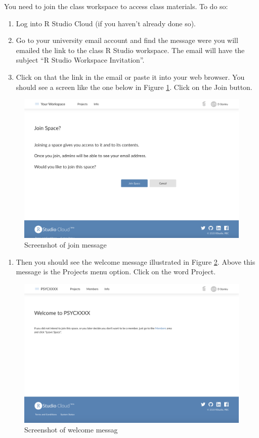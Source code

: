 \documentclass[
]{krantz}
\providecommand{\tightlist}{%
  \setlength{\itemsep}{0pt}\setlength{\parskip}{0pt}}
\begin{document}
You need to join the class workspace to access class materials. To do so:

\begin{enumerate}
\def\labelenumi{\arabic{enumi}.}
\item
  Log into R Studio Cloud (if you haven't already done so).
\item
  Go to your university email account and find the message were you will emailed the link to the class R Studio workspace. The email will have the subject ``R Studio Workspace Invitation''.
\item
  Click on that the link in the email or paste it into your web browser. You should see a screen like the one below in Figure \ref{fig:join}. Click on the Join button.
\end{enumerate}

\begin{figure}
\includegraphics[width=0.85\linewidth]{first_time/images/screenshot_join} \caption{Screenshot of join message}\label{fig:join}
\end{figure}

\begin{enumerate}
\def\labelenumi{\arabic{enumi}.}
\setcounter{enumi}{3}
\tightlist
\item
  Then you should see the welcome message illustrated in Figure \ref{fig:welcome}. Above this message is the Projects menu option. Click on the word Project.
\end{enumerate}

\begin{figure}
\includegraphics[width=0.85\linewidth]{first_time/images/screenshot_welcome} \caption{Screenshot of welcome messag}\label{fig:welcome}
\end{figure}
\end{document}
